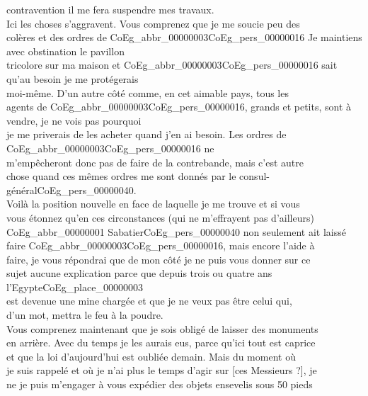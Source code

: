 \documentclass{book}
\begin{document}
contravention il me fera suspendre mes travaux.\\
\indent Ici les choses s’aggravent. Vous comprenez que je me soucie peu des\\
colères et des ordres de \gls{CoEg_abbr_00000003}\gls{CoEg_pers_00000016} Je maintiens avec obstination le pavillon\\
tricolore sur ma maison et \gls{CoEg_abbr_00000003}\gls{CoEg_pers_00000016} sait qu’au besoin je me protégerais\\
moi-même. D’un autre côté comme, en cet aimable pays, tous les\\
agents de \gls{CoEg_abbr_00000003}\gls{CoEg_pers_00000016}, grands et petits, sont à vendre, je ne vois pas pourquoi\\
je me priverais de les acheter quand j’en ai besoin. Les ordres de \gls{CoEg_abbr_00000003}\gls{CoEg_pers_00000016} ne\\
m’empêcheront donc pas de faire de la contrebande, mais c’est autre\\
chose quand ces mêmes ordres me sont donnés par le consul-général\gls{CoEg_pers_00000040}.\\
\indent Voilà la position nouvelle en face de laquelle je me trouve et si vous\\
vous étonnez qu’en ces circonstances (qui ne m’effrayent pas d’ailleurs)\\
\gls{CoEg_abbr_00000001} Sabatier\gls{CoEg_pers_00000040} non seulement ait laissé faire \gls{CoEg_abbr_00000003}\gls{CoEg_pers_00000016}, mais encore l’aide à\\
faire, je vous répondrai que de mon côté je ne puis vous donner sur ce\\
sujet aucune explication parce que depuis trois ou quatre ans l’Egypte\gls{CoEg_place_00000003}\\
est devenue une mine chargée et que je ne veux pas être celui qui,\\
d’un mot, mettra le feu à la poudre.\\
\indent Vous comprenez maintenant que je sois obligé de laisser des monuments\\
en arrière. Avec du temps je les aurais eus, parce qu’ici tout est caprice\\
et que la loi d’aujourd’hui est oubliée demain. Mais du moment où\\
je suis rappelé et où je n’ai plus le temps d’agir sur {[ces Messieurs ?]}, je\\
ne je puis m’engager à vous expédier des objets ensevelis sous 50 pieds\\
\end{document}
